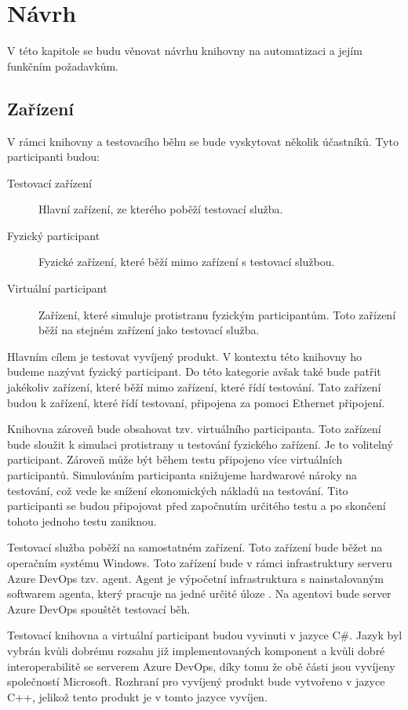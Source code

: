 \chapter{Návrh}

V této kapitole se budu věnovat návrhu knihovny na automatizaci a jejím funkčním požadavkům.

\section{Zařízení}
V rámci knihovny a testovacího běhu se bude vyskytovat několik účastníků. Tyto participanti budou:

\begin{description}
    \item[Testovací zařízení] Hlavní zařízení, ze kterého poběží testovací služba.
    \item[Fyzický participant] Fyzické zařízení, které běží mimo zařízení s testovací službou. 
    \item[Virtuální participant] Zařízení, které simuluje protistranu fyzickým participantům. Toto zařízení běží na stejném zařízení jako testovací služba.
\end{description}

Hlavním cílem je testovat vyvíjený produkt. V kontextu této knihovny ho budeme nazývat fyzický participant. Do této kategorie avšak také bude patřit jakékoliv zařízení, které běží mimo zařízení, které řídí testování. Tato zařízení budou k zařízení, které řídí testovaní, připojena za pomoci Ethernet připojení.

Knihovna zároveň bude obsahovat tzv. virtuálního participanta. Toto zařízení bude sloužit k simulaci protistrany u testování fyzického zařízení. Je to volitelný participant. Zároveň může být během testu připojeno více virtuálních participantů. Simulováním participanta snižujeme hardwarové nároky na testování, což vede ke snížení ekonomických nákladů na testování. Tito participanti se budou připojovat před započnutím určitého testu a po skončení tohoto jednoho testu zaniknou.

Testovací služba poběží na samostatném zařízení. Toto zařízení bude běžet na operačním systému Windows. Toto zařízení bude v rámci infrastruktury serveru Azure DevOps tzv. agent. Agent je výpočetní infrastruktura s nainstalovaným softwarem agenta, který pracuje na jedné určité úloze \cite{agent_docs}. Na agentovi bude server Azure DevOps spouštět testovací běh.

Testovací knihovna a virtuální participant budou vyvinuti v jazyce C\#. Jazyk byl vybrán kvůli dobrému rozsahu již implementovaných komponent a kvůli dobré interoperabilitě se serverem Azure DevOps, díky tomu že obě části jsou vyvíjeny společností Microsoft. Rozhraní pro vyvíjený produkt bude vytvořeno v jazyce C++, jelikož tento produkt je v tomto jazyce vyvíjen.


